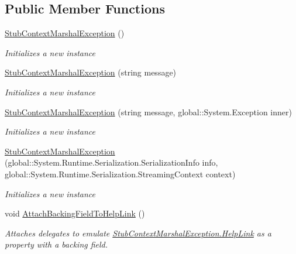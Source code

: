 \subsection*{Public Member Functions}
\begin{DoxyCompactItemize}
\item 
\hyperlink{class_system_1_1_fakes_1_1_stub_context_marshal_exception_a90a2b493e30a4bedd6ecd3b2ad97d03a}{Stub\-Context\-Marshal\-Exception} ()
\begin{DoxyCompactList}\small\item\em Initializes a new instance\end{DoxyCompactList}\item 
\hyperlink{class_system_1_1_fakes_1_1_stub_context_marshal_exception_a1943db51488913002da32ab449840159}{Stub\-Context\-Marshal\-Exception} (string message)
\begin{DoxyCompactList}\small\item\em Initializes a new instance\end{DoxyCompactList}\item 
\hyperlink{class_system_1_1_fakes_1_1_stub_context_marshal_exception_aa46d6a38b7edf96c663273eeb91b04da}{Stub\-Context\-Marshal\-Exception} (string message, global\-::\-System.\-Exception inner)
\begin{DoxyCompactList}\small\item\em Initializes a new instance\end{DoxyCompactList}\item 
\hyperlink{class_system_1_1_fakes_1_1_stub_context_marshal_exception_abf5b667097e5bbeb40543f26abd9804d}{Stub\-Context\-Marshal\-Exception} (global\-::\-System.\-Runtime.\-Serialization.\-Serialization\-Info info, global\-::\-System.\-Runtime.\-Serialization.\-Streaming\-Context context)
\begin{DoxyCompactList}\small\item\em Initializes a new instance\end{DoxyCompactList}\item 
void \hyperlink{class_system_1_1_fakes_1_1_stub_context_marshal_exception_a79d8424a0469f84dd35e3c31710f015e}{Attach\-Backing\-Field\-To\-Help\-Link} ()
\begin{DoxyCompactList}\small\item\em Attaches delegates to emulate \hyperlink{class_system_1_1_fakes_1_1_stub_context_marshal_exception_a825e5b72be08b5025f64cd4d3c0ff818}{Stub\-Context\-Marshal\-Exception.\-Help\-Link} as a property with a backing field.\end{DoxyCompactList}\item 

\end{DoxyCompactItemize}
